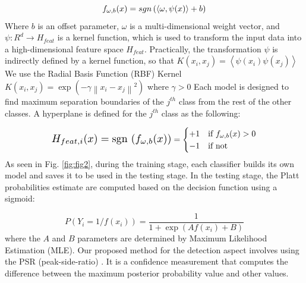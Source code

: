 \documentclass{ieeeaccess}
\begin{document}
\begin{equation}
{f_{\omega ,b}}(x) = {\mathop{\rm sgn}} \left( {\left\langle {\omega ,\psi (x)} \right\rangle  + b} \right)
\label{eq19}
\end{equation} 
Where $b$ is an offset parameter, $ \omega $  is a multi-dimensional weight vector, and $\psi :{R^d} \to {H_{feat}}$   is a kernel function, which is used to transform the input data into a high-dimensional feature space $ H_{feat} $. Practically, the transformation  $\psi$ is indirectly defined by a kernel function, so that 
$K({x_i},{x_j}) = \left\langle {\psi ({x_i})\psi ({x_j})} \right\rangle $ We use the Radial Basis Function (RBF) Kernel $K({x_i},{x_j}) = \exp ( - \gamma {\left\| {{x_i} - {x_j}} \right\|^2})$ where $ \gamma >0  $ Each model is designed to find maximum separation boundaries of the $ j^{th} $ class from the rest of the other classes. A hyperplane is defined for the $ j^{th} $ class as the following:

\begin{equation}
\resizebox{0.42\hsize}{!}{$H_{feat,i}(x) = \text{sgn $( f_{\omega ,b}(x))$}$}  = 
\begin{cases} 
+1     &    \text{if $ f_{\omega ,b}(x) > 0 $}  \\
-1     &    \text{if not} 
\end{cases} 
\label{eq20}
\end{equation} 
As seen in Fig. \ref{fig:fig2}, during the training stage, each classifier builds its own model and saves it to be used in the testing stage. In the testing stage, the Platt probabilities estimate \cite{36} are computed based on the decision function using a sigmoid: 

\begin{equation}
P({Y_i} = 1/f({x_i})) = \frac{1}{{1 + \exp (Af({x_i}) + B)}}
\label{eq21}
\end{equation} 
where the $A$ and $B$ parameters are determined by Maximum Likelihood Estimation (MLE). Our proposed method for the detection aspect involves using the PSR (peak-side-ratio) \cite{5}. It is a confidence measurement that computes the difference between the maximum posterior probability value and other values. 
\end{document}
